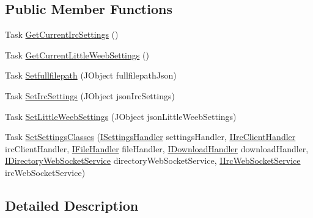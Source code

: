 \subsection*{Public Member Functions}
\begin{DoxyCompactItemize}
\item 
Task \mbox{\hyperlink{interface_little_weeb_library_1_1_services_1_1_i_settings_web_socket_service_ab23ceb6d97191ccdbef5584caa1964a1}{Get\+Current\+Irc\+Settings}} ()
\item 
Task \mbox{\hyperlink{interface_little_weeb_library_1_1_services_1_1_i_settings_web_socket_service_a4d6f03913f7445083d6b572438853bc0}{Get\+Current\+Little\+Weeb\+Settings}} ()
\item 
Task \mbox{\hyperlink{interface_little_weeb_library_1_1_services_1_1_i_settings_web_socket_service_a295e6129fa61ceca9564f774442ca79e}{Setfullfilepath}} (J\+Object fullfilepath\+Json)
\item 
Task \mbox{\hyperlink{interface_little_weeb_library_1_1_services_1_1_i_settings_web_socket_service_a553587be5ed3abeda3a1c239a93b65c2}{Set\+Irc\+Settings}} (J\+Object json\+Irc\+Settings)
\item 
Task \mbox{\hyperlink{interface_little_weeb_library_1_1_services_1_1_i_settings_web_socket_service_a30b412115be9b4480ab1d195674b1c49}{Set\+Little\+Weeb\+Settings}} (J\+Object json\+Little\+Weeb\+Settings)
\item 
Task \mbox{\hyperlink{interface_little_weeb_library_1_1_services_1_1_i_settings_web_socket_service_a84507a02937d9fbfb1edb25251ec7f90}{Set\+Settings\+Classes}} (\mbox{\hyperlink{interface_little_weeb_library_1_1_handlers_1_1_i_settings_handler}{I\+Settings\+Handler}} settings\+Handler, \mbox{\hyperlink{interface_little_weeb_library_1_1_handlers_1_1_i_irc_client_handler}{I\+Irc\+Client\+Handler}} irc\+Client\+Handler, \mbox{\hyperlink{interface_little_weeb_library_1_1_handlers_1_1_i_file_handler}{I\+File\+Handler}} file\+Handler, \mbox{\hyperlink{interface_little_weeb_library_1_1_handlers_1_1_i_download_handler}{I\+Download\+Handler}} download\+Handler, \mbox{\hyperlink{interface_little_weeb_library_1_1_services_1_1_i_directory_web_socket_service}{I\+Directory\+Web\+Socket\+Service}} directory\+Web\+Socket\+Service, \mbox{\hyperlink{interface_little_weeb_library_1_1_services_1_1_i_irc_web_socket_service}{I\+Irc\+Web\+Socket\+Service}} irc\+Web\+Socket\+Service)
\end{DoxyCompactItemize}


\subsection{Detailed Description}


